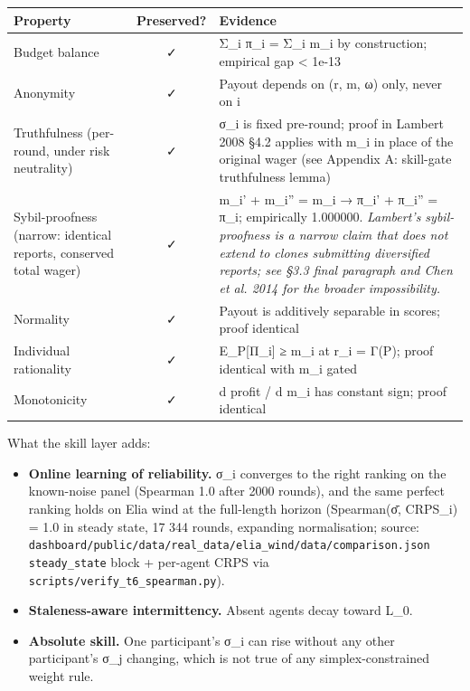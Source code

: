 \documentclass[11pt,a4paper,openany]{report}
\begin{document}
\begin{center}
\small
\begin{tabular}{lcl}
\toprule
\textbf{Property} & \textbf{Preserved?} & \textbf{Evidence} \\
\midrule
Budget balance & ✓ & Σ\_i π\_i = Σ\_i m\_i by construction; empirical gap < 1e-13 \\
Anonymity & ✓ & Payout depends on (r, m, ω) only, never on i \\
Truthfulness (per-round, under risk neutrality) & ✓ & σ\_i is fixed pre-round; proof in Lambert 2008 §4.2 applies with m\_i in place of the original wager (see Appendix A: skill-gate truthfulness lemma) \\
Sybil-proofness (narrow: identical reports, conserved total wager) & ✓ & m\_i' + m\_i'' = m\_i → π\_i' + π\_i'' = π\_i; empirically 1.000000. \emph{Lambert's sybil-proofness is a narrow claim that does not extend to clones submitting diversified reports; see §3.3 final paragraph and Chen et al. 2014 for the broader impossibility.} \\
Normality & ✓ & Payout is additively separable in scores; proof identical \\
Individual rationality & ✓ & E\_P[Π\_i] ≥ m\_i at r\_i = Γ(P); proof identical with m\_i gated \\
Monotonicity & ✓ & d profit / d m\_i has constant sign; proof identical \\
\bottomrule
\end{tabular}
\end{center}

What the skill layer adds:

\begin{itemize}
  \item \textbf{Online learning of reliability.} σ\_i converges to the right
    ranking on the known-noise panel (Spearman 1.0 after 2000 rounds),
    and the same perfect ranking holds on Elia wind at the full-length
    horizon (Spearman(σ̄, CRPS\_i) = 1.0 in steady state, 17 344 rounds,
    expanding normalisation; source:
    \texttt{dashboard/public/data/real\_data/elia\_wind/data/comparison.json}
    \texttt{steady\_state} block + per-agent CRPS via
    \texttt{scripts/verify\_t6\_spearman.py}).
  \item \textbf{Staleness-aware intermittency.} Absent agents decay toward L\_0.
  \item \textbf{Absolute skill.} One participant's σ\_i can rise without any other
    participant's σ\_j changing, which is not true of any
    simplex-constrained weight rule.
\end{itemize}
\end{document}

